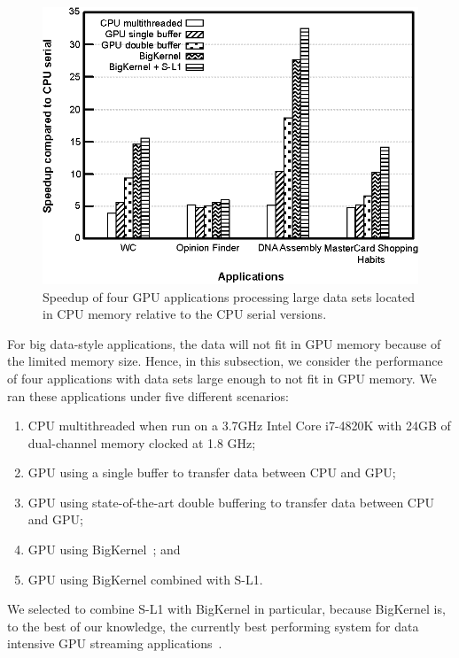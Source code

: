 \begin{figure}[t]
\center
\includegraphics[scale=0.80]{11bigkernelAndSl1.eps}
\vspace{-0.0cm}
\caption{\footnotesize\textnormal{Speedup of four GPU applications processing large data sets located in CPU memory relative to the CPU serial versions.}}
\label{fig:bigkernelandsl1}
\end{figure}


For big data-style applications, the data will not fit in GPU memory because of the limited memory size. Hence, in this
subsection, we consider the performance of four applications with data sets large enough to not fit in GPU memory. We
ran these applications under five different scenarios:
\begin{enumerate}
\item CPU multithreaded when run on a 3.7GHz Intel Core i7-4820K with 24GB of dual-channel memory clocked at 1.8 GHz;
\item GPU using a single buffer to transfer data between CPU and GPU;
\item GPU using state-of-the-art double buffering to transfer data between CPU and GPU;
\item GPU using BigKernel~\cite{mokhtari2014bigkernel}; and
\item GPU using BigKernel combined with S-L1.
\end{enumerate} 
We selected to combine S-L1 with BigKernel in particular, because BigKernel is,
to the best of our knowledge,
the currently best performing system for data intensive GPU streaming
applications~\cite{mokhtari2014bigkernel}.

